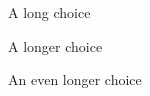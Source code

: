 \noindent\begin{multichoice}[before=\hspace{2em},itemjoin=\hspace{3em},label=\bf\arabic*{})]
\item A long choice
\item A longer choice\\\hspace*{3em}
\item An even longer choice
\end{multichoice}
